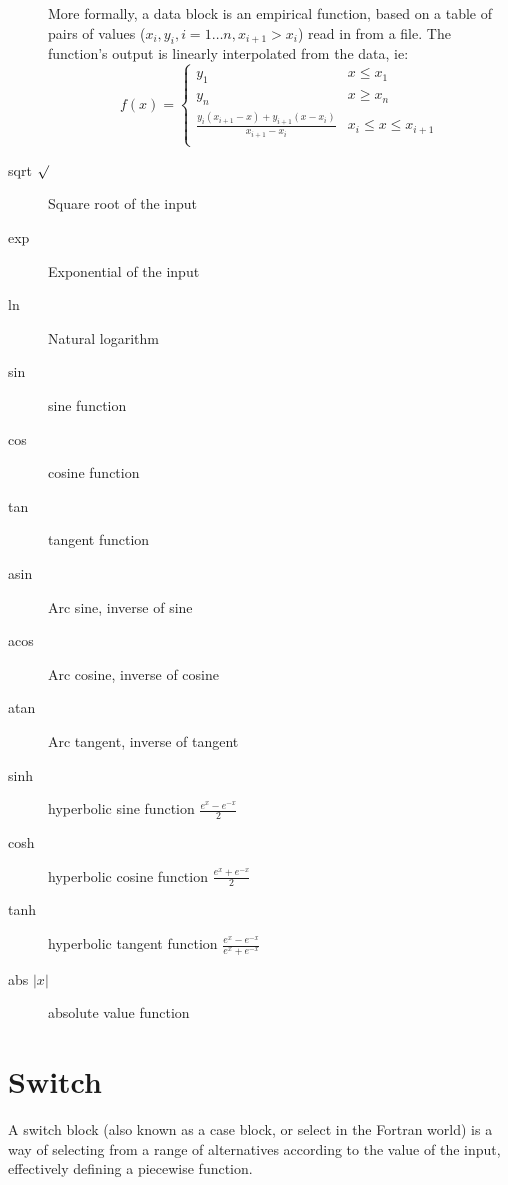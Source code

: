 \begin{description}
More formally, a data block is an empirical function, based on a table
of pairs of values ($x_i, y_i, i=1\ldots n, x_{i+1}>x_i$) read in from
a file. The function's output is linearly interpolated from the data,
ie:
\begin{displaymath}
f(x) = \left\{
\begin{array}{cl}
y_1 & x\leq x_1\\
y_n & x\geq x_n\\
\frac{y_i(x_{i+1}-x)+y_{i+1}(x-x_i)}{x_{i+1}-x_i} & x_i \leq x \leq
x_{i+1}\\
\end{array}
\right.
\end{displaymath}

\item[sqrt $\surd$]\label{op:sqrt} Square root of the input

\item[exp]\label{op:exp} Exponential of the input

\item[ln]\label{op:ln} Natural logarithm

\item[sin]\label{op:sin} sine function
\item[cos]\label{op:cos} cosine function
\item[tan]\label{op:tan} tangent function
\item[asin]\label{op:asin} Arc sine, inverse of sine
\item[acos]\label{op:acos} Arc cosine, inverse of cosine
\item[atan]\label{op:atan} Arc tangent, inverse of tangent
\item[sinh]\label{op:sinh} hyperbolic sine function $\frac{e^x-e^{-x}}2$
\item[cosh]\label{op:cosh} hyperbolic cosine function $\frac{e^x+e^{-x}}2$
\item[tanh]\label{op:tanh} hyperbolic tangent function $\frac{e^x-e^{-x}}{e^x+e^{-x}}$
\item[abs $|x|$]\label{op:abs} absolute value function

\end{description}

\section{Switch}\label{switch}

A switch block (also known as a case block, or select in the Fortran
world) is a way of selecting from a range of alternatives according
to the value of the input, effectively defining a piecewise function.


